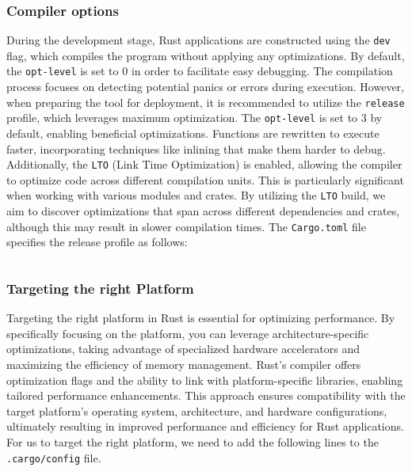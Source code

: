 \begin{code}
    \inputminted{rust}{code/listings/10-3_main.rs}
\end{code}

\subsubsection{Compiler options}

During the development stage, Rust applications are constructed using the \texttt{dev} flag, which compiles the program without applying any optimizations. By default, the \texttt{opt-level} is set to 0 in order to facilitate easy debugging. The compilation process focuses on detecting potential panics or errors during execution. However, when preparing the tool for deployment, it is recommended to utilize the \texttt{release} profile, which leverages maximum optimization. The \texttt{opt-level} is set to 3 by default, enabling beneficial optimizations. Functions are rewritten to execute faster, incorporating techniques like inlining that make them harder to debug. Additionally, the \texttt{LTO} (Link Time Optimization) is enabled, allowing the compiler to optimize code across different compilation units. This is particularly significant when working with various modules and crates. By utilizing the \texttt{LTO} build, we aim to discover optimizations that span across different dependencies and crates, although this may result in slower compilation times. The \texttt{Cargo.toml} file specifies the release profile as follows:

\begin{code}
    \inputminted{toml}{code/listings/10-4_cargo.toml}
\end{code}

\subsubsection{Targeting the right Platform}

Targeting the right platform in Rust is essential for optimizing performance. By specifically focusing on the platform, you can leverage architecture-specific optimizations, taking advantage of specialized hardware accelerators and maximizing the efficiency of memory management. Rust's compiler offers optimization flags and the ability to link with platform-specific libraries, enabling tailored performance enhancements. This approach ensures compatibility with the target platform's operating system, architecture, and hardware configurations, ultimately resulting in improved performance and efficiency for Rust applications. For us to target the right platform, we need to add the following lines to the \texttt{.cargo/config} file.

